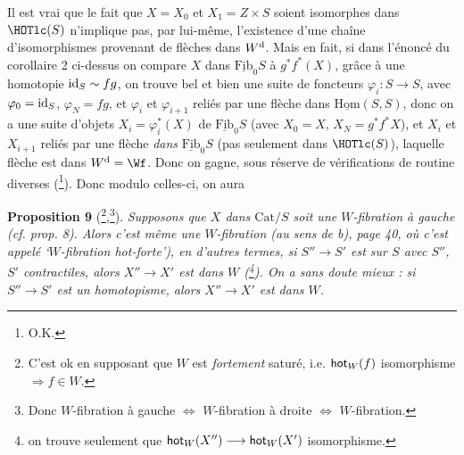 Il est vrai que le fait que $X = X_0$ et $X_1 = Z \times S$ soient isomorphes dans $\HOTlc(S)$ n'implique pas, par lui-même, l'existence d'une  chaîne d'isomorphismes provenant de flèches dans $W^{\mathrm{d}}$. Mais en fait, si dans l'énoncé du corollaire 2 ci-dessus on compare $X$ dans $\underline{\mathrm{Fib}}_0S$ à $g^*f^*(X)$, grâce à une homotopie $\mathrm{id}_S \sim fg$, on trouve bel et bien une suite de foncteurs $\varphi_i : S \longrightarrow S$, avec $\varphi_0 = \mathrm{id}_S$, $\varphi_N = fg$, et $\varphi_i$ et $\varphi_{i+1}$ reliés par une flèche dans $\underline{\mathrm{Hom}}(S,S)$, donc on a une suite d'objets $X_i = \varphi_i^*(X)$ de $\underline{\mathrm{Fib}}_0S$ (avec $X_0 = X$, $X_N = g^*f^*X$), et $X_i$ et $X_{i+1}$ reliés par une flèche \textit{dans} $\underline{\mathrm{Fib}}_0S$ (pas seulement dans $\HOTlc(S)$), laquelle flèche est dans $\Wd = \Wf$. Donc on gagne, sous réserve de vérifications de routine diverses (\footnote[55]{O.K.}). Donc modulo celles-ci, on aura

\textbf{Proposition 9} (\footnote[56]{C'est ok en supposant que $W$ est \textit{fortement} saturé, i.e. $\mathsf{hot}_W(f)$ isomorphisme $\Longrightarrow f \in W$.},\footnote[57]{Donc $W$-fibration à gauche $\Longleftrightarrow$ $W$-fibration à droite $\Longleftrightarrow$ $W$-fibration.}). \textit{Supposons que $X$ dans $\mathrm{Cat}/S$ soit une $W$-fibration à gauche (cf. prop. 8). Alors c'est même une $W$-fibration (au sens de b), page 40, où c'est appelé `$W$-fibration \textup{hot}-forte'), en d'autres termes, si $S'' \longrightarrow S'$ est sur $S$ avec $S''$, $S'$ contractiles, alors $X'' \longrightarrow X'$ est dans $W$ (\footnote[58]{on trouve seulement que $\mathsf{hot}_W(X'') \longrightarrow \mathsf{hot}_W(X')$ isomorphisme.}). On a sans doute mieux : si $S'' \longrightarrow S'$ est un homotopisme, alors $X'' \longrightarrow X'$ est dans $W$.}

